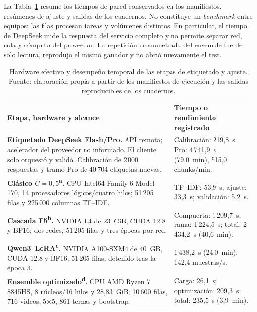 La Tabla~\ref{tab:hardware_tiempos} resume los tiempos de pared conservados en los manifiestos, resúmenes de ajuste y salidas de los cuadernos. No constituye un \emph{benchmark} entre equipos: las filas procesan tareas y volúmenes distintos. En particular, el tiempo de DeepSeek mide la respuesta del servicio completo y no permite separar red, cola y cómputo del proveedor. La repetición cronometrada del ensemble fue de solo lectura, reprodujo el mismo ganador y no abrió nuevamente el test.

\begin{table}[!t]
\centering
\caption{Hardware efectivo y desempeño temporal de las etapas de etiquetado y ajuste. Fuente: elaboración propia a partir de los manifiestos de ejecución y las salidas reproducibles de los cuadernos.}
\label{tab:hardware_tiempos}
\scriptsize
\renewcommand{\arraystretch}{1.14}
\begin{tabularx}{\columnwidth}{@{}p{}X@{}}
\toprule
\textbf{Etapa, hardware y alcance} & \textbf{Tiempo o rendimiento registrado} \\
\midrule
\textbf{Etiquetado DeepSeek Flash/Pro.} API remota; acelerador del proveedor no informado. El cliente solo orquestó y validó. Calibración de 2\,000 respuestas y tramo Pro de 40\,704 etiquetas nuevas. & Calibración: 219,8~s. Pro: 4\,741,9~s (79,0~min), 515,0 chunks/min. \\
\textbf{Clásico $C=0,5$\textsuperscript{a}.} CPU Intel64 Family 6 Model 170, 14 procesadores lógicos/cuatro hilos; 51\,205 filas y 225\,000 columnas TF--IDF. & TF--IDF: 53,9~s; ajuste: 33,3~s; validación: 5,2~s. \\
\textbf{Cascada E5\textsuperscript{b}.} NVIDIA L4 de 23~GiB, CUDA 12.8 y BF16; dos redes, 51\,205 filas y tres épocas por red. & Compuerta: 1\,209,7~s; rama: 1\,224,5~s; total: 2\,434,2~s (40,6~min). \\
\textbf{Qwen3--LoRA\textsuperscript{c}.} NVIDIA A100-SXM4 de 40~GB, CUDA 12.8 y BF16; 51\,205 filas, detenido tras la época 3. & 1\,438,2~s (24,0~min); 142,4 muestras/s. \\
\textbf{Ensemble optimizado\textsuperscript{d}.} CPU AMD Ryzen 7 8845HS, 8 núcleos/16 hilos y 28,83~GiB; 10\,600 filas, 716 videos, 5$\times$5, 861 ternas y bootstrap. & Carga: 26,1~s; optimización: 209,3~s; total: 235,5~s (3,9~min). \\
\bottomrule
\end{tabularx}
\end{table}
